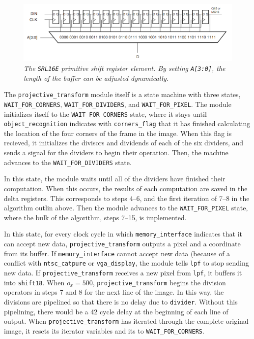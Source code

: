 \documentclass[10pt]{article}
\begin{document}
\begin{figure}[h!]
\centering
\includegraphics[width=\textwidth]{images/srl16.png}
\caption{\emph{The {\tt SRL16E} primitive shift register element. By setting {\tt A[3:0]}, the length of the buffer can be adjusted dynamically.}}
\end{figure}

The {\tt projective\_transform} module itself is a state machine with three states, {\tt WAIT\_FOR\_CORNERS}, {\tt WAIT\_FOR\_DIVIDERS}, and {\tt WAIT\_FOR\_PIXEL}. The module initializes itself to the {\tt WAIT\_FOR\_CORNERS} state, where it stays until {\tt object\_recognition} indicates with {\tt corners\_flag} that it has finished calculating the location of the four corners of the frame in the image. When this flag is recieved, it initializes the divisors and dividends of each of the six dividers, and sends a signal for the dividers to begin their operation. Then, the machine advances to the {\tt WAIT\_FOR\_DIVIDERS} state.

In this state, the module waits until all of the dividers have finished their computation. When this occurs, the results of each computation are saved in the delta registers. This corresponds to steps 4--6, and the first iteration of 7--8 in the algorithm outlin above. Then the module advances to the {\tt WAIT\_FOR\_PIXEL} state, where the bulk of the algorithm, steps 7--15, is implemented.

In this state, for every clock cycle in which {\tt memory\_interface} indicates that it can accept new data, {\tt projective\_transform} outputs a pixel and a coordinate from its buffer. If {\tt memory\_interface} cannot accept new data (because of a conflict with {\tt ntsc\_catpure} or {\tt vga\_display}, the module tells {\tt lpf} to stop sending new data. If {\tt projective\_transform} receives a new pixel from {\tt lpf}, it buffers it into {\tt shift18}. When $o_x = 500$, {\tt projective\_transform} begins the division operators in steps 7 and 8 for the next line of the image. In this way, the divisions are pipelined so that there is no delay due to {\tt divider}. Without this pipelining, there would be a 42 cycle delay at the beginning of each line of output. When {\tt projective\_transform} has iterated through the complete original image, it resets its iterator variables and its to {\tt WAIT\_FOR\_CORNERS}.
\end{document}
